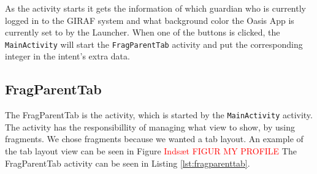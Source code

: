 As the activity starts it gets the information of which guardian who is currently logged in to the GIRAF system and what background color the Oasis App is currently set to by the Launcher.
When one of the buttons is clicked, the \texttt{MainActivity} will start the \texttt{FragParentTab} activity and put the corresponding integer in the intent's extra data.

\subsection{FragParentTab}
The FragParentTab is the activity, which is started by the \texttt{MainActivity} activity.
The activity has the responsibillity of managing what view to show, by using fragments.
We chose fragments because we wanted a tab layout.
An example of the tab layout view can be seen in Figure \textcolor{red}{Inds\ae{}t FIGUR MY PROFILE}
The FragParentTab activity can be seen in Listing \vref{lst:fragparenttab}.

